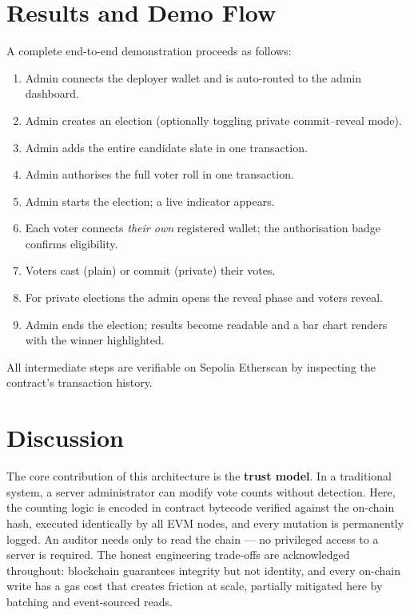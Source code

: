 \documentclass[11pt]{article}
\begin{document}
\section{Results and Demo Flow}
A complete end-to-end demonstration proceeds as follows:
\begin{enumerate}[nosep]
  \item Admin connects the deployer wallet and is auto-routed to the admin dashboard.
  \item Admin creates an election (optionally toggling private commit--reveal mode).
  \item Admin adds the entire candidate slate in one transaction.
  \item Admin authorises the full voter roll in one transaction.
  \item Admin starts the election; a live indicator appears.
  \item Each voter connects \emph{their own} registered wallet; the authorisation badge confirms eligibility.
  \item Voters cast (plain) or commit (private) their votes.
  \item For private elections the admin opens the reveal phase and voters reveal.
  \item Admin ends the election; results become readable and a bar chart renders with the winner highlighted.
\end{enumerate}
All intermediate steps are verifiable on Sepolia Etherscan by inspecting the contract's
transaction history.

\section{Discussion}
The core contribution of this architecture is the \textbf{trust model}. In a traditional
system, a server administrator can modify vote counts without detection. Here, the counting
logic is encoded in contract bytecode verified against the on-chain hash, executed
identically by all EVM nodes, and every mutation is permanently logged. An auditor needs only
to read the chain --- no privileged access to a server is required. The honest engineering
trade-offs are acknowledged throughout: blockchain guarantees integrity but not identity, and
every on-chain write has a gas cost that creates friction at scale, partially mitigated here
by batching and event-sourced reads.

\end{document}
